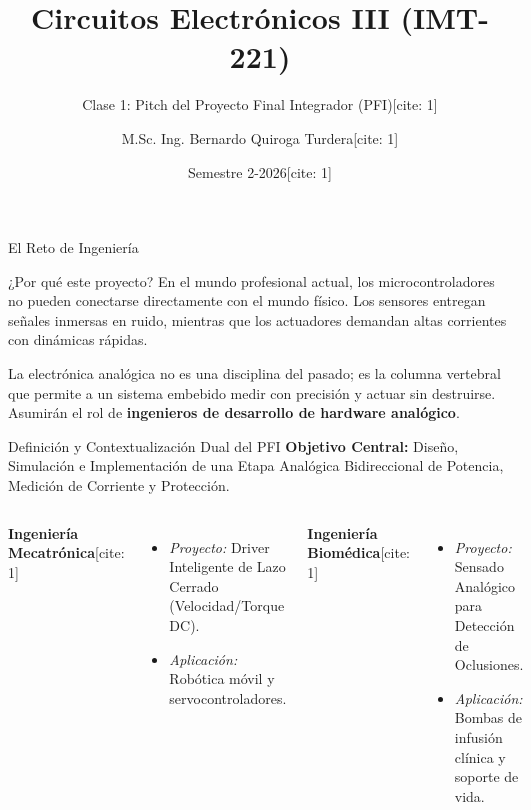 \documentclass[aspectratio=169]{beamer}
\title{Circuitos Electrónicos III (IMT-221)}
\subtitle{Clase 1: Pitch del Proyecto Final Integrador (PFI)[cite: 1]}
\author{M.Sc. Ing. Bernardo Quiroga Turdera[cite: 1]}
\institute{Universidad Católica Boliviana ``San Pablo'' - Sede Tarija[cite: 1]}
\date{Semestre 2-2026[cite: 1]}
\begin{document}
\begin{frame}
    \titlepage
\end{frame}

\begin{frame}{El Reto de Ingeniería}
    \begin{block}{¿Por qué este proyecto?}
        En el mundo profesional actual, los microcontroladores no pueden conectarse directamente con el mundo físico. Los sensores entregan señales inmersas en ruido, mientras que los actuadores demandan altas corrientes con dinámicas rápidas.
    \end{block}
    \vspace{0.5cm}
    La electrónica analógica no es una disciplina del pasado; es la columna vertebral que permite a un sistema embebido medir con precisión y actuar sin destruirse. Asumirán el rol de \textbf{ingenieros de desarrollo de hardware analógico}.
\end{frame}

\begin{frame}{Definición y Contextualización Dual del PFI}
    \textbf{Objetivo Central:} Diseño, Simulación e Implementación de una Etapa Analógica Bidireccional de Potencia, Medición de Corriente y Protección.
    \vspace{0.3cm}
    \begin{columns}
        \textbf{Ingeniería Mecatrónica}[cite: 1]
        \begin{itemize}
            \item \textit{Proyecto:} Driver Inteligente de Lazo Cerrado (Velocidad/Torque DC).
            \item \textit{Aplicación:} Robótica móvil y servocontroladores.
        \end{itemize}
        
        \textbf{Ingeniería Biomédica}[cite: 1]
        \begin{itemize}
            \item \textit{Proyecto:} Sensado Analógico para Detección de Oclusiones.
            \item \textit{Aplicación:} Bombas de infusión clínica y soporte de vida.
        \end{itemize}
    \end{columns}
\end{frame}
\end{document}
